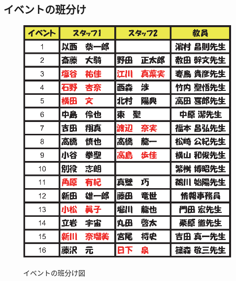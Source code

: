 \subsection{イベントの班分け}
\begin{figure}[H]
\begin{center}

\includegraphics[scale=0.8]{./19/event_hanwake.eps}
\label{fig:Eventhanwake}
\caption{イベントの班分け図}
\end{center}
\end{figure}



%
